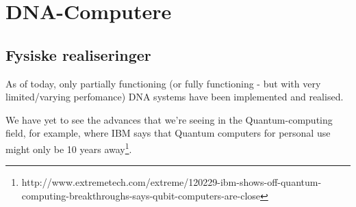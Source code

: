 
\section{DNA-Computere}

\subsection{Fysiske realiseringer}
As of today, only partially functioning (or fully functioning - but with very
limited/varying perfomance) DNA systems have been implemented and realised.

We have yet to see the advances that we're seeing in the Quantum-computing
field, for example, where IBM says that Quantum computers for personal use might
only be 10 years away\footnote{http://www.extremetech.com/extreme/120229-ibm-shows-off-quantum-computing-breakthroughs-says-qubit-computers-are-close}.




